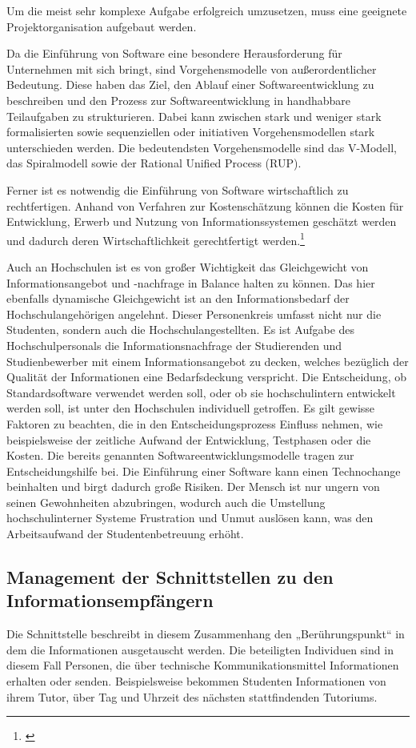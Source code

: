 Um die meist sehr komplexe Aufgabe erfolgreich umzusetzen, muss eine geeignete Projektorganisation aufgebaut werden.

Da die Einführung von Software eine besondere Herausforderung für Unternehmen mit sich bringt, sind Vorgehensmodelle von außerordentlicher Bedeutung. 
Diese haben das Ziel, den Ablauf einer Softwareentwicklung zu beschreiben und den Prozess zur Softwareentwicklung in handhabbare Teilaufgaben zu strukturieren. 
Dabei kann zwischen stark und weniger stark formalisierten sowie sequenziellen oder initiativen Vorgehensmodellen stark unterschieden werden. 
Die bedeutendsten Vorgehensmodelle sind das V-Modell, das Spiralmodell sowie der Rational Unified Process (RUP).

Ferner ist es notwendig die Einführung von Software wirtschaftlich zu rechtfertigen. Anhand von Verfahren zur Kostenschätzung können die Kosten für Entwicklung, Erwerb und Nutzung von Informationssystemen geschätzt werden und dadurch deren Wirtschaftlichkeit gerechtfertigt werden.\footnote{\cite{krcmar_einfuhrung_2015}}

Auch an Hochschulen ist es von großer Wichtigkeit das Gleichgewicht von Informationsangebot und -nachfrage in Balance halten zu können. 
Das hier ebenfalls dynamische Gleichgewicht ist an den Informationsbedarf der Hochschulangehörigen angelehnt. 
Dieser Personenkreis umfasst nicht nur die Studenten, sondern auch die Hochschulangestellten. 
Es ist Aufgabe des Hochschulpersonals die Informationsnachfrage der Studierenden und Studienbewerber mit einem Informationsangebot zu decken, welches bezüglich der Qualität der Informationen eine Bedarfsdeckung verspricht. 
Die Entscheidung, ob Standardsoftware verwendet werden soll, oder ob sie hochschulintern entwickelt werden soll, ist unter den Hochschulen individuell getroffen. 
Es gilt gewisse Faktoren zu beachten, die in den Entscheidungsprozess Einfluss nehmen, wie beispielsweise der zeitliche Aufwand der Entwicklung, Testphasen oder die Kosten. 
Die bereits genannten Softwareentwicklungsmodelle tragen zur Entscheidungshilfe bei.
Die Einführung einer Software kann einen Technochange beinhalten und birgt dadurch große Risiken. 
Der Mensch ist nur ungern von seinen Gewohnheiten abzubringen, wodurch auch die Umstellung hochschulinterner Systeme Frustration und Unmut auslösen kann, was den Arbeitsaufwand der Studentenbetreuung erhöht.

\subsection{Management der Schnittstellen zu den Informationsempfängern}
Die Schnittstelle beschreibt in diesem Zusammenhang den „Berührungspunkt“ in dem die Informationen ausgetauscht werden. 
Die beteiligten Individuen sind in diesem Fall Personen, die über technische Kommunikationsmittel Informationen erhalten oder senden. 
Beispielsweise bekommen Studenten Informationen von ihrem Tutor, über Tag und Uhrzeit des nächsten stattfindenden Tutoriums. 

